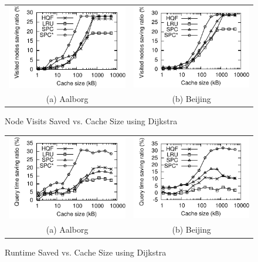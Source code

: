 \begin{figure}[htb]
\center
  \begin{tabular}{@{}c@{ }c@{}}
     \includegraphics[width=0.5\columnwidth]{figures/cachesize_diffnodes_aal_server.pdf}
     &
     \includegraphics[width=0.5\columnwidth]{figures/cachesize_diffnodes_bei_server.pdf}
      \\
     (a) Aalborg & (b)  Beijing
     \end{tabular}
\caption{Node Visits Saved vs. Cache Size using Dijkstra}
\label{fig:cachesize_diffnodes_server}
\end{figure}

\begin{figure}[htb]
\center
  \begin{tabular}{@{}c@{ }c@{}}
     \includegraphics[width=0.5\columnwidth]{figures/cachesize_diffruntime_aal_server.pdf}
     &
     \includegraphics[width=0.5\columnwidth]{figures/cachesize_diffruntime_bei_server.pdf}
      \\
     (a) Aalborg & (b)  Beijing
     \end{tabular}
\caption{Runtime Saved vs. Cache Size using Dijkstra}
\label{fig:cachesize_diffruntime_server}
\end{figure}

